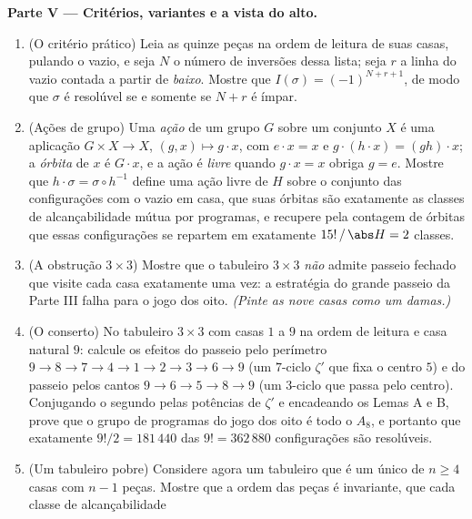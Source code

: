\begin{problem}
\medskip
\noindent\textbf{Parte V --- Critérios, variantes e a vista do
alto.}
\begin{enumerate}[resume]
  \item (O critério prático) Leia as quinze peças na
        ordem de leitura de suas casas, pulando o vazio, e seja
        $N$ o número de inversões dessa lista; seja $r$
        a linha do vazio contada a partir de \emph{baixo}. Mostre
        que $I(\sigma) = (-1)^{N + r + 1}$, de modo que $\sigma$ é
        resolúvel se e somente se $N + r$ é ímpar.
  \item (Ações de grupo) Uma \emph{ação} de um grupo $G$ sobre um conjunto
        $X$ é uma aplicação $G \times X \to X$, $(g, x) \mapsto g \cdot
        x$, com $e \cdot x = x$ e $g \cdot (h \cdot x) =
        (gh) \cdot x$; a \emph{órbita} de $x$ é $G \cdot x$, e
        a ação é \emph{livre} quando $g \cdot x = x$ obriga $g =
        e$. Mostre que $h \cdot \sigma = \sigma \circ h^{-1}$
        define uma ação livre de $H$ sobre o conjunto das
        configurações com o vazio em casa, que suas órbitas são exatamente as
        classes de alcançabilidade mútua por programas, e recupere pela
        contagem de órbitas que essas configurações se repartem em exatamente
        $15!\,/\,\abs H = 2$ classes.
  \item (A obstrução $3 \times 3$) Mostre que o tabuleiro $3 \times 3$
        \emph{não} admite passeio fechado que visite cada casa
        exatamente uma vez: a estratégia do grande passeio da Parte III falha
        para o jogo dos oito. \emph{(Pinte as nove
        casas como um damas.)}
  \item (O conserto) No tabuleiro $3 \times 3$ com casas $1$ a
        $9$ na ordem de leitura e casa natural $9$: calcule os efeitos
        do passeio pelo perímetro $9 \to 8 \to 7 \to 4 \to 1 \to 2 \to 3
        \to 6 \to 9$ (um $7$-ciclo $\zeta'$ que fixa o centro $5$)
        e do passeio pelos cantos $9 \to 6 \to 5 \to 8 \to 9$ (um
        $3$-ciclo que passa pelo centro). Conjugando o segundo pelas
        potências de $\zeta'$ e encadeando os Lemas A e B, prove
        que o grupo de programas do jogo dos oito é todo o $A_8$,
        e portanto que exatamente $9!/2 = 181\,440$ das $9! =
        362\,880$ configurações são resolúveis.
  \item (Um tabuleiro pobre) Considere agora um tabuleiro que é um único  de $n
        \geq 4$ casas com $n - 1$ peças. Mostre que a ordem
         das peças é invariante, que cada classe de alcançabilidade

\end{enumerate}
\end{problem}
